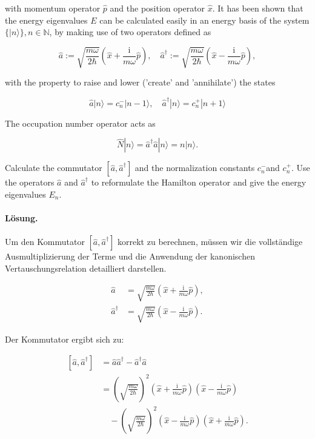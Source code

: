 \documentclass[11pt,a4paper]{article}
\begin{document}
with momentum operator $\hat{p}$ and the position operator $\hat{x}$.
It has been shown that the energy eigenvalues $E$ can be calculated easily in an energy basis of the system $\{|n\rangle\}, n \in \mathbb{N}$, by making use of two operators defined as

$$
\hat{a}:=\sqrt{\frac{m \omega}{2 \hbar}}\left(\hat{x}+\frac{\mathrm{i}}{m \omega} \hat{p}\right), \quad \hat{a}^{\dagger}:=\sqrt{\frac{m \omega}{2 \hbar}}\left(\hat{x}-\frac{\mathrm{i}}{m \omega} \hat{p}\right),
$$

with the property to raise and lower ('create' and 'annihilate') the states

$$
\hat{a}|n\rangle=c_n^{-}|n-1\rangle, \quad \hat{a}^{\dagger}|n\rangle=c_n^{+}|n+1\rangle
$$


The occupation number operator acts as

$$
\hat{N}|n\rangle=\hat{a}^{\dagger} \hat{a}|n\rangle=n|n\rangle .
$$


Calculate the commutator $\left[\hat{a}, \hat{a}^{\dagger}\right]$ and the normalization constants $c_n^{-}$and $c_n^{+}$. Use the operators $\hat{a}$ and $\hat{a}^{\dagger}$ to reformulate the Hamilton operator and give the energy eigenvalues $E_n$.

\paragraph{Lösung.}
Um den Kommutator $\left[\hat{a}, \hat{a}^{\dagger}\right]$ korrekt zu berechnen, müssen wir die vollständige Ausmultiplizierung der Terme und die Anwendung der kanonischen Vertauschungsrelation detailliert darstellen.

\begin{align*}
\hat{a} &= \sqrt{\frac{m \omega}{2 \hbar}}\left(\hat{x} + \frac{\mathrm{i}}{m \omega} \hat{p}\right), \\
\hat{a}^{\dagger} &= \sqrt{\frac{m \omega}{2 \hbar}}\left(\hat{x} - \frac{\mathrm{i}}{m \omega} \hat{p}\right).
\end{align*}

Der Kommutator ergibt sich zu:

\begin{align*}
\left[\hat{a}, \hat{a}^{\dagger}\right] &= \hat{a} \hat{a}^{\dagger} - \hat{a}^{\dagger} \hat{a} \\
&= \left(\sqrt{\frac{m \omega}{2 \hbar}}\right)^2 \left(\hat{x} + \frac{\mathrm{i}}{m \omega} \hat{p}\right)\left(\hat{x} - \frac{\mathrm{i}}{m \omega} \hat{p}\right) \\
&\quad - \left(\sqrt{\frac{m \omega}{2 \hbar}}\right)^2 \left(\hat{x} - \frac{\mathrm{i}}{m \omega} \hat{p}\right)\left(\hat{x} + \frac{\mathrm{i}}{m \omega} \hat{p}\right).
\end{align*}
\end{document}
